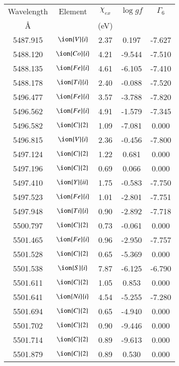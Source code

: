 \documentclass[fleqn,usenatbib]{mnras}
\begin{document}
\begin{center}
 \begin{table}
 \begin{tabular}{ccccc}
 \hline
 Wavelength & Element & $\chi_{ex}$ &  $\log gf$ & $\varGamma_{6}$ \\
   \AA{}    &         &  (eV)       &            &                  \\
 \hline
5487.915 &  $\ion{V}{i}$  & 2.37 & 0.197 & -7.627 \\ 
5488.120 &  $\ion{Co}{i}$  & 4.21 & -9.544 & -7.510 \\ 
5488.135 &  $\ion{Fe}{i}$  & 4.61 & -6.105 & -7.410 \\ 
5488.178 &  $\ion{Ti}{i}$  & 2.40 & -0.088 & -7.520 \\ 
5496.477 &  $\ion{Fe}{i}$  & 3.57 & -3.788 & -7.820 \\ 
5496.562 &  $\ion{Fe}{i}$  & 4.91 & -1.579 & -7.345 \\ 
5496.582 &  $\ion{C}{2}$ & 1.09 & -7.081 & 0.000 \\ 
5496.815 &  $\ion{V}{i}$  & 2.36 & -0.456 & -7.800 \\ 
5497.124 &  $\ion{C}{2}$ & 1.22 & 0.681 & 0.000 \\ 
5497.196 &  $\ion{C}{2}$ & 0.69 & 0.066 & 0.000 \\ 
5497.410 &  $\ion{Y}{ii}$  & 1.75 & -0.583 & -7.750 \\ 
5497.523 &  $\ion{Fe}{i}$  & 1.01 & -2.801 & -7.751 \\ 
5497.948 &  $\ion{Ti}{i}$  & 0.90 & -2.892 & -7.718 \\ 
5500.797 &  $\ion{C}{2}$ & 0.73 & -0.061 & 0.000 \\ 
5501.465 &  $\ion{Fe}{i}$  & 0.96 & -2.950 & -7.757 \\ 
5501.528 &  $\ion{C}{2}$ & 0.65 & -5.369 & 0.000 \\ 
5501.538 &  $\ion{S}{i}$  & 7.87 & -6.125 & -6.790 \\ 
5501.611 &  $\ion{C}{2}$ & 1.05 & 0.853 & 0.000 \\ 
5501.641 &  $\ion{Ni}{i}$  & 4.54 & -5.255 & -7.280 \\ 
5501.694 &  $\ion{C}{2}$ & 0.65 & -4.940 & 0.000 \\ 
5501.702 &  $\ion{C}{2}$ & 0.90 & -9.446 & 0.000 \\ 
5501.714 &  $\ion{C}{2}$ & 0.89 & -9.613 & 0.000 \\ 
5501.879 &  $\ion{C}{2}$ & 0.89 & 0.530 & 0.000 \\ 

\end{tabular}
\end{table}
\end{center}
\end{document}

